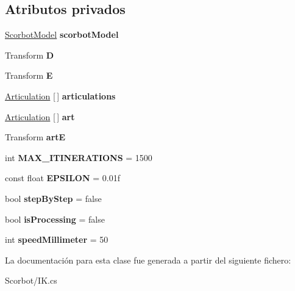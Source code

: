 \subsection*{Atributos privados}
\begin{DoxyCompactItemize}
\item 
\mbox{\label{class_i_k_adcd01966b5a64adc0a00bc71d93f20f5}} 
\mbox{\hyperlink{class_scorbot_model}{Scorbot\+Model}} {\bfseries scorbot\+Model}
\item 
\mbox{\label{class_i_k_aeda196da26592113cfbeb37ce08c98e0}} 
Transform {\bfseries D}
\item 
\mbox{\label{class_i_k_abfcf0b83294daebc45f90599cefa6229}} 
Transform {\bfseries E}
\item 
\mbox{\label{class_i_k_a57627b5cca74a00c64e634a594ce1771}} 
\mbox{\hyperlink{class_articulation}{Articulation}} \mbox{[}$\,$\mbox{]} {\bfseries articulations}
\item 
\mbox{\label{class_i_k_a04cbf786c36a2dd4c351004aa368e516}} 
\mbox{\hyperlink{class_articulation}{Articulation}} \mbox{[}$\,$\mbox{]} {\bfseries art}
\item 
\mbox{\label{class_i_k_a03fd580172cd3b0291accbe80a196dc4}} 
Transform {\bfseries artE}
\item 
\mbox{\label{class_i_k_a0c00a388b3d050426ab61e12bf27a273}} 
int {\bfseries M\+A\+X\+\_\+\+I\+T\+I\+N\+E\+R\+A\+T\+I\+O\+NS} = 1500
\item 
\mbox{\label{class_i_k_ae5c8e8a09e081841fce1b05f9011eff2}} 
const float {\bfseries E\+P\+S\+I\+L\+ON} = 0.\+01f
\item 
\mbox{\label{class_i_k_a2d29f5085328a70671f072635109956e}} 
bool {\bfseries step\+By\+Step} = false
\item 
\mbox{\label{class_i_k_a80d856621b05838051c780a713c57a7a}} 
bool {\bfseries is\+Processing} = false
\item 
\mbox{\label{class_i_k_a9ccf13cced2d5f0264321b52d9f1e6a6}} 
int {\bfseries speed\+Millimeter} = 50
\end{DoxyCompactItemize}


La documentación para esta clase fue generada a partir del siguiente fichero\+:\begin{DoxyCompactItemize}
\item 
Scorbot/I\+K.\+cs\end{DoxyCompactItemize}
